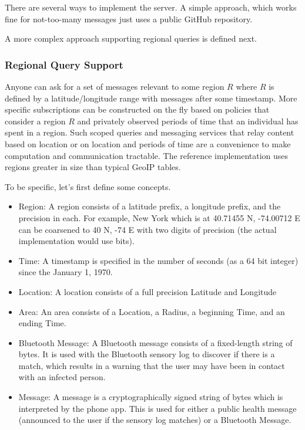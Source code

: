 There are several ways to implement the server.  A simple approach, which works fine for not-too-many messages just uses a public GitHub repository.

A more complex approach supporting regional queries is defined next.  

\subsubsection{Regional Query Support}
Anyone can ask for a set of messages relevant to some region $R$ where $R$ is defined by a latitude/longitude range with messages after some timestamp.  More specific subscriptions can be constructed on the fly based on policies that consider a region $R$ and privately observed periods of time that an individual has spent in a region. Such scoped queries and messaging services that relay content based on location or on location and periods of time are a convenience to make computation and communication tractable.  The reference implementation uses regions greater in size than typical GeoIP tables.

To be specific, let's first define some concepts.
\begin{itemize}
    \item Region: A region consists of a latitude prefix, a longitude prefix, and the precision in each.  For example, New York which is at 40.71455 N, -74.00712 E can be coarsened to 40 N, -74 E with two digits of precision (the actual implementation would use bits).
    \item Time: A timestamp is specified in the number of seconds (as a 64 bit integer) since the January 1, 1970. 
    \item Location: A location consists of a full precision Latitude and Longitude
    \item Area: An area consists of a Location, a Radius, a beginning Time, and an ending Time.
    \item Bluetooth Message: A Bluetooth message consists of a fixed-length string of bytes.  It is used with the Bluetooth sensory log to discover if there is a match, which results in a warning that the user may have been in contact with an infected person.  
    \item Message: A message is a cryptographically signed string of bytes which is interpreted by the phone app. This is used for either a public health message (announced to the user if the sensory log matches) or a Bluetooth Message. 
\end{itemize}

